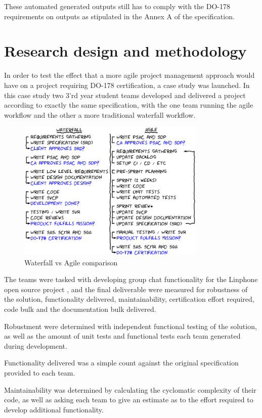 \documentclass[conference]{IEEEtran}
\begin{document}
These automated generated outputs still has to comply with the DO-178 requirements on outputs as stipulated in the Annex A of the specification.

\section{Research design and methodology}

In order to test the effect that a more agile project management approach would have on a project requiring DO-178 certification, a case study was launched. In this case study two 3'rd year student teams developed and delivered a project according to exactly the same specification, with the one team running the agile workflow and the other a more traditional waterfall workflow.  

\begin{figure}[t!]
\centering 
\includegraphics[width=90mm]{agileWaterfallTeamActivities.png}
\caption{Waterfall vs Agile comparison}
\end{figure}

The teams were tasked with developing group chat functionality for the Linphone open source project \cite{Linphone_2015}, and the final deliverable were measured for robustness of the solution, functionality delivered, maintainability, certification effort required, code bulk and the documentation bulk delivered.

Robustment were determined with independent functional testing of the solution, as well as the amount of unit tests and functional tests each team generated during development. 

Functionality delivered was a simple count against the original specification provided to each team.

Maintainability was determined by calculating the cyclomatic complexity of their code, as well as asking each team to give an estimate as to the effort required to develop additional functionality.
\end{document}
